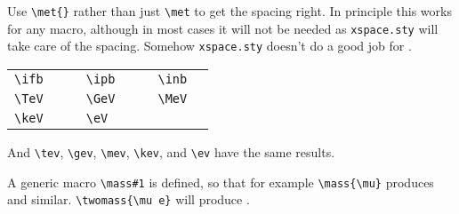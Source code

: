 \documentclass[11pt,a4paper]{cepcnote}
\begin{document}
\noindent Use \verb+\met{}+ rather than just \verb+\met+ to get the spacing
right. In principle this works for any macro, although in most cases it will
not be needed as {\tt xspace.sty} will take care of the spacing. Somehow
{\tt xspace.sty} doesn't do a good job for \met.

\vspace{5mm}

\begin{tabular}{llcllcll}
\verb+\ifb+ & \ifb{} & \hspace{1cm} &
\verb+\ipb+ & \ipb{} & \hspace{1cm} &
\verb+\inb+ & \inb{} \\
\verb+\TeV+ & \TeV{} & &
\verb+\GeV+ & \GeV{} & &
\verb+\MeV+ & \MeV{} \\
\verb+\keV+ & \keV{} & &
\verb+\eV+ & \eV{} & & & \\
\end{tabular}

\medskip

\noindent And \verb+\tev+, \verb+\gev+, \verb+\mev+, \verb+\kev+, and
\verb+\ev+ have the same results.

\medskip

\noindent A generic macro \verb+\mass#1+ is defined, so that for example
\verb+\mass{\mu}+ produces \mass{\mu} and similar.
\verb+\twomass{\mu e}+ will produce .
\end{document}
